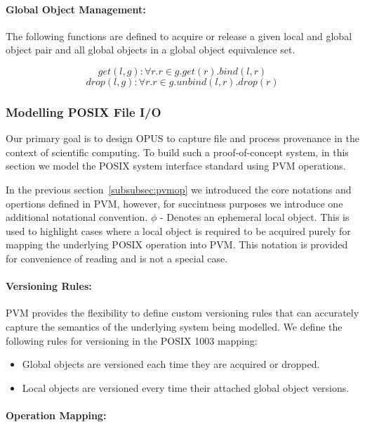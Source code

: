\documentclass[withindex,glossary]{cam-thesis}
\begin{document}
\paragraph{Global Object Management:}
The following functions are defined to acquire or release a given local and global object pair and all global objects in a global object equivalence set.

$$get(l, g):\forall r.r \in g.get(r).bind(l,r)$$
$$drop(l, g):\forall r.r \in g.unbind(l, r).drop(r)$$


\subsubsection{Modelling POSIX File I/O}
Our primary goal is to design OPUS to capture file and process provenance in the context of scientific computing.
To build such a proof-of-concept system, in this section we model the POSIX system interface standard using PVM operations.

In the previous section~\ref{subsubsec:pvmop} we introduced the core notations and opertions defined in PVM, however, for succintness purposes we introduce one additional notational convention.
$\phi$ - Denotes an ephemeral local object. This is used to highlight cases where a local object is required to be acquired purely for mapping the underlying POSIX operation into PVM.
This notation is provided for convenience of reading and is not a special case.

\paragraph{Versioning Rules:}
PVM provides the flexibility to define custom versioning rules that can accurately capture the semantics of the underlying system being modelled.
We define the following rules for versioning in the POSIX 1003 mapping:

\begin{itemize}
\item Global objects are versioned each time they are acquired or dropped.
\item Local objects are versioned every time their attached global object versions.
\end{itemize}

\paragraph{Operation Mapping:}
\end{document}

